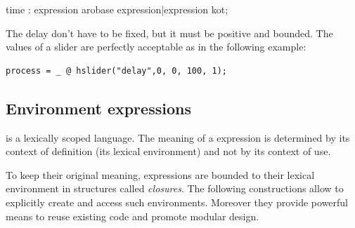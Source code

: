 \documentclass[a4paper,10pt]{book}
\begin{document}
\begin{rail}
time : expression arobase expression|expression kot; 
\end{rail}

The delay don't have to be fixed, but it must be positive and bounded. The values of a slider are perfectly acceptable as in the following example:

\begin{lstlisting}
process = _ @ hslider("delay",0, 0, 100, 1);
\end{lstlisting}

\subsection{Environment expressions}
\faust is a lexically scoped language. The meaning of a \faust expression is determined by its context of definition (its lexical environment) and not by its context of use. 

To keep their original meaning, \faust expressions are bounded to their lexical environment in structures called \textit{closures}. The following constructions allow to explicitly create and access such environments. Moreover they provide powerful means to reuse existing code and promote modular design.

\end{document}
